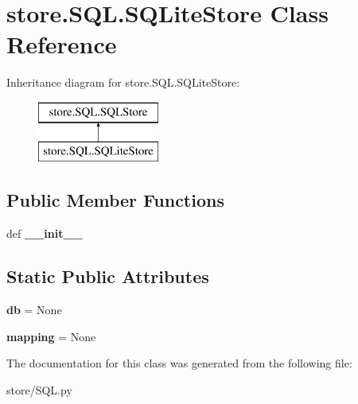 \hypertarget{classstore_1_1_s_q_l_1_1_s_q_lite_store}{\section{store.\-S\-Q\-L.\-S\-Q\-Lite\-Store Class Reference}
\label{classstore_1_1_s_q_l_1_1_s_q_lite_store}
}
Inheritance diagram for store.\-S\-Q\-L.\-S\-Q\-Lite\-Store\-:\begin{figure}[H]
\begin{center}
\leavevmode
\includegraphics[height=2.000000cm]{classstore_1_1_s_q_l_1_1_s_q_lite_store}
\end{center}
\end{figure}
\subsection*{Public Member Functions}
\begin{DoxyCompactItemize}
\item 
\hypertarget{classstore_1_1_s_q_l_1_1_s_q_lite_store_a00364758f9fcc21fe247f4c67fb5cb24}{def {\bfseries \-\_\-\-\_\-init\-\_\-\-\_\-}}\label{classstore_1_1_s_q_l_1_1_s_q_lite_store_a00364758f9fcc21fe247f4c67fb5cb24}

\end{DoxyCompactItemize}
\subsection*{Static Public Attributes}
\begin{DoxyCompactItemize}
\item 
\hypertarget{classstore_1_1_s_q_l_1_1_s_q_lite_store_ad061ef69f1653db1ca2317d7362e2fbf}{{\bfseries db} = None}\label{classstore_1_1_s_q_l_1_1_s_q_lite_store_ad061ef69f1653db1ca2317d7362e2fbf}

\item 
\hypertarget{classstore_1_1_s_q_l_1_1_s_q_lite_store_ae201768cd3991fe286f2e486a7945943}{{\bfseries mapping} = None}\label{classstore_1_1_s_q_l_1_1_s_q_lite_store_ae201768cd3991fe286f2e486a7945943}

\end{DoxyCompactItemize}


The documentation for this class was generated from the following file\-:\begin{DoxyCompactItemize}
\item 
store/S\-Q\-L.\-py\end{DoxyCompactItemize}
